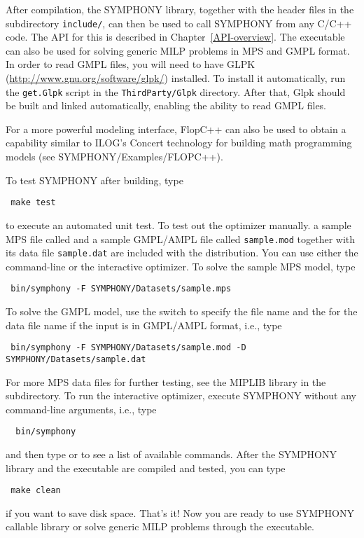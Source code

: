 After compilation, the SYMPHONY library, together with the header files in the
subdirectory {\color{Brown}\texttt{include/}}, can then be used to call
SYMPHONY from any C/C++ code. The API for this is described in
Chapter~\ref{API-overview}. The executable can also be used for solving
generic MILP problems in MPS and GMPL format. In order to read GMPL files, you
will need to have GLPK (\url{http://www.gnu.org/software/glpk/}) installed. To
install it automatically, run the \texttt{get.Glpk} script in the
\texttt{ThirdParty/Glpk} directory. After that, Glpk should be built and
linked automatically, enabling the ability to read GMPL files.

For a more powerful modeling interface, FlopC++ can also be used to obtain a
capability similar to ILOG's Concert technology for building math programming
models (see SYMPHONY/Examples/FLOPC++). 

To test SYMPHONY after building, type
{\color{Brown}
\begin{verbatim}
 make test
\end{verbatim}
} to execute an automated unit test. To test out the optimizer manually. a
sample MPS file called  and a sample GMPL/AMPL file called
{\color{Brown}\texttt{sample.mod}} together with its data file
{\color{Brown}\texttt{sample.dat}} are included with the distribution. You can
use either the command-line or the interactive optimizer. To solve the sample
MPS model, type {\color{Brown}
\begin{verbatim}
 bin/symphony -F SYMPHONY/Datasets/sample.mps
\end{verbatim}
} To solve the GMPL model, use the  switch to specify the file name
and the  for the data file name if the input is in GMPL/AMPL format,
i.e., type 
{\color{Brown}
\begin{verbatim}
 bin/symphony -F SYMPHONY/Datasets/sample.mod -D SYMPHONY/Datasets/sample.dat
\end{verbatim}}
For more MPS data files for further testing, see the MIPLIB library in the
 subdirectory. To run the interactive optimizer, execute SYMPHONY
without any command-line arguments, i.e., type
{\color{Brown}
\begin{verbatim}
  bin/symphony 
\end{verbatim}}
and then type  or  to see a list of available commands.
After the SYMPHONY library and the executable are compiled and tested, you
can type
{\color{Brown}
\begin{verbatim}
 make clean 
\end{verbatim}}
if you want to save disk space. That's it! Now you are ready to use SYMPHONY
callable library or solve generic MILP problems through the executable.

